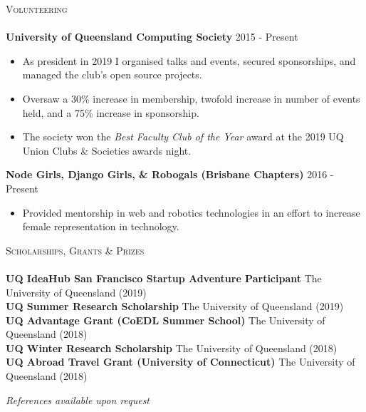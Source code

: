\documentclass[a4paper]{article}
\newcommand{\lineunder} {
    \vspace*{-8pt} \\
    \hspace*{-10pt} \hrulefill \\
}
\newcommand{\header} [1] {
    {\hspace*{-10pt}\vspace*{6pt} \textsc{#1}}
    \vspace*{-6pt} \lineunder
}
\newenvironment{singleitem}
{   \small
    \vspace{0pt}
    \begin{itemize}
    \setlength{\itemsep}{0pt}
    \setlength{\parskip}{0pt}
    \setlength{\parsep}{0pt}   }
{\end{itemize} \vspace{1pt}	}
\begin{document}
\header{Volunteering}
\textbf{University of Queensland Computing Society} \hfill 2015 - Present\\
\begin{singleitem}
	\item As president in 2019 I organised talks and events, secured sponsorships, and managed the club's open source projects.
	\item Oversaw a 30\% increase in membership, twofold increase in number of events held, and a 75\% increase in sponsorship.
	\item The society won the \textit{Best Faculty Club of the Year} award at the 2019 UQ Union Clubs \& Societies awards night.
\end{singleitem}
\textbf{Node Girls, Django Girls, \& Robogals (Brisbane Chapters)} \hfill 2016 - Present\\
\begin{singleitem}
	\item Provided mentorship in web and robotics technologies in an effort to increase female representation in technology.
\end{singleitem}

\vspace{1mm}

\header{Scholarships, Grants \& Prizes}
\textbf{UQ IdeaHub San Francisco Startup Adventure Participant} \hfill The University of Queensland (2019)\\
\textbf{UQ Summer Research Scholarship} \hfill The University of Queensland (2019)\\
\textbf{UQ Advantage Grant (CoEDL Summer School)} \hfill The University of Queensland (2018)\\
\textbf{UQ Winter Research Scholarship} \hfill The University of Queensland (2018)\\
\textbf{UQ Abroad Travel Grant (University of Connecticut)} \hfill The University of Queensland (2018)\\


\vspace{3.5mm}
\begin{center}
\small \textit{References available upon request}
\end{center}
\end{document}
